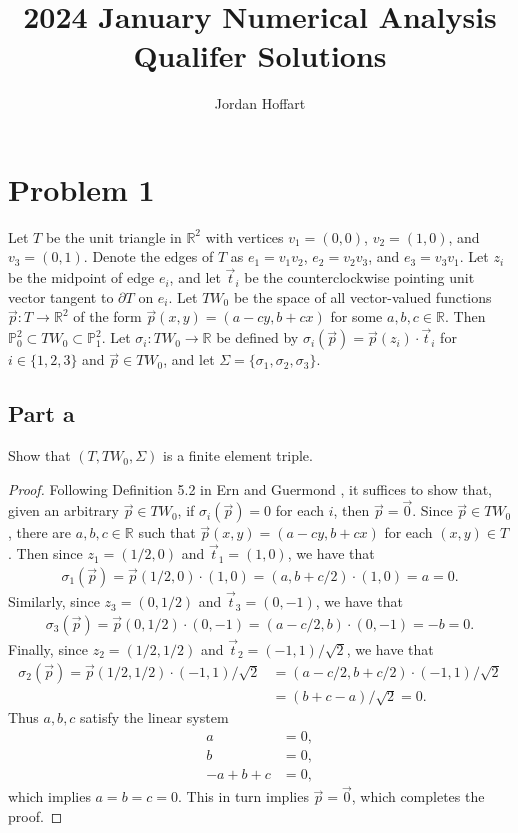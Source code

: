 \documentclass{article}
\title{2024 January Numerical Analysis Qualifer Solutions}
\author{Jordan Hoffart}
\date{}
\begin{document}
\maketitle
\section*{Problem 1}
Let $T$ be the unit triangle in $\mathbb R^2$ with vertices $v_1 = (0,0)$, $v_2 = (1,0)$, and $v_3 = (0,1)$.
Denote the edges of $T$ as $e_1 = v_1v_2$, $e_2 = v_2v_3$, and $e_3 = v_3v_1$.
Let $z_i$ be the midpoint of edge $e_i$, and let $\vec t_i$ be the counterclockwise pointing unit vector tangent to $\partial T$ on $e_i$.
Let $TW_0$ be the space of all vector-valued functions $\vec p : T \to \mathbb R^2$ of the form $\vec p(x,y) = (a - cy, b + cx)$ for some $a,b,c \in \mathbb R$.
Then $\mathbb P_0^2 \subset TW_0 \subset \mathbb P_1^2$.
Let $\sigma_i : TW_0 \to \mathbb R$ be defined by $\sigma_i(\vec p) = \vec p(z_i) \cdot \vec t_i$ for $i \in \{1,2,3\}$ and $\vec p \in TW_0$, and let $\Sigma = \{\sigma_1,\sigma_2,\sigma_3\}$.

\subsection*{Part a}
Show that $(T,TW_0,\Sigma)$ is a finite element triple.
\begin{proof}
	Following Definition 5.2 in Ern and Guermond \cite{EG21}, it suffices to show that, given an arbitrary $\vec p \in TW_0$, if $\sigma_i(\vec p) = 0$ for each $i$, then $\vec p = \vec 0$.
	Since $\vec p \in TW_0$, there are $a,b,c\in\mathbb R$ such that $\vec p(x,y) = (a-cy,b+cx)$ for each $(x,y) \in T$.
	Then since $z_1 = (1/2,0)$ and $\vec t_1 = (1,0)$, we have that
	\begin{align*}
		\sigma_1(\vec p) = \vec p(1/2,0)\cdot(1,0) = (a,b+c/2)\cdot(1,0) = a = 0.
	\end{align*}
	Similarly, since $z_3 = (0,1/2)$ and $\vec t_3 = (0,-1)$, we have that
	\begin{align*}
		\sigma_3(\vec p) = \vec p(0,1/2)\cdot(0,-1) = (a-c/2,b)\cdot(0,-1) = -b = 0.
	\end{align*}
	Finally, since $z_2 = (1/2,1/2)$ and $\vec t_2 = (-1,1)/\sqrt{2}$, we have that
	\begin{align*}
		\sigma_2(\vec p) = \vec p(1/2,1/2)\cdot(-1,1)/\sqrt{2} & = (a-c/2,b+c/2)\cdot(-1,1)/\sqrt{2} \\
		                                                       & = (b + c - a)/\sqrt{2} = 0.
	\end{align*}
	Thus $a,b,c$ satisfy the linear system
	\begin{align*}
		a          & = 0, \\
		b          & = 0, \\
		-a + b + c & = 0,
	\end{align*}
	which implies $a = b = c = 0$.
	This in turn implies $\vec p = \vec 0$, which completes the proof.
\end{proof}
\end{document}
